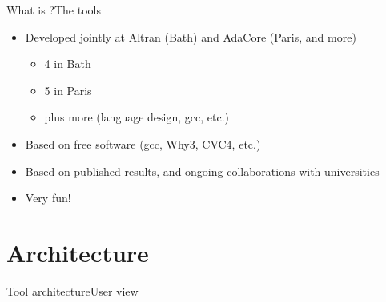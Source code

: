 \documentclass{beamer}
\begin{document}
\begin{frame}[fragile]{What is \spark?}{The tools}
  \begin{itemize}
  \item Developed jointly at Altran (Bath) and AdaCore (Paris, and
    more)
    \begin{itemize}
    \item 4 in Bath
    \item 5 in Paris
    \item plus more (language design, gcc, etc.)
    \end{itemize}
  \item Based on free software (gcc, Why3, CVC4, etc.)
  \item Based on published results, and ongoing collaborations with
    universities
  \item Very fun!
  \end{itemize}
\end{frame}


\section{Architecture}

\begin{frame}{Tool architecture}{User view}
  \begin{center}
  \end{center}
\end{frame}
\end{document}
